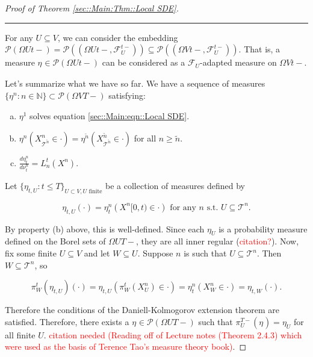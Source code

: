 \documentclass[12pt]{article}
\newcommand{\mb}{\mathbb}
\newcommand{\mc}{\mathcal}
\newcommand{\ms}{\mathscr}
\newcommand{\te}{\text}
\newcommand{\tr}{\textcolor{red}}
\newcommand{\ind}{\hspace{24pt}}
\newcommand{\lin}{\rule{\linewidth}{0.4 pt}}
\newcommand{\pmsr}{\mc{P}}							%
\renewcommand{\U}{U}							%
\newcommand{\UU}{W}								%
\newcommand{\T}{T}								%
\renewcommand{\t}{t}							%
\newcommand{\pup}[1]{^{#1}}							%
\newcommand{\tree}{\mc{T}}							%
\newcommand{\V}{V}									%
\newcommand{\numb}{n}								%
\newcommand{\piV}[2]{\pi_{#1}^{#2}}					%
\newcommand{\rxvtsn}[3]{X_{#1}^{#3}{#2}}			%
\newcommand{\mm}[3]{\nu_{#2#1}^{#3}}						%
\newcommand{\mmm}[3]{\eta_{#2#1}^{#3}}						%
\newcommand{\F}[2]{\mc{F}_{#1}^{#2}}				%
\newcommand{\alt}{\widetilde}						%
\newcommand{\dense}[2]{L_{#1}^{#2}}				%
\begin{document}
\begin{proof}[Proof of Theorem \ref{sec::Main:Thm::Local SDE}]
\lin

For any \(\U\subseteq \V\), we can consider the embedding \(\pmsr\left(\Omega{\U}{\t-}\right) = \pmsr\left((\Omega{\U}{\t-},\F{\U}{\t-})\right) \subseteq \pmsr\left((\Omega{\V}{\t-},\F{\U}{\t-})\right)\). That is, a measure \(\mmm{}{}{}\in \pmsr\left(\Omega{\U}{\t-}\right)\) can be considered as a \(\F{\U}{}\)-adapted measure on \(\Omega{\V}{\t-}\).

\ind Let's summarize what we have so far. We have a sequence of measures \(\{\mmm{}{}{\numb}:\numb\in\mb{N}\} \subset \pmsr(\Omega{\V}{\T-})\) satisfying:

\begin{enumerate}[(a)]
\item \(\mmm{}{}{1}\) solves equation \eqref{sec::Main:eqn::Local SDE}.

\item \(\mmm{}{}{\numb}(\rxvtsn{\tree\pup{\alt{\numb}}}{}{\numb} \in \cdot) = \mmm{}{}{\alt{\numb}}(\rxvtsn{\tree\pup{\alt{\numb}}}{}{\alt{\numb}}\in \cdot)\) for all \(\numb \geq \alt{\numb}\).

\item \(\frac{d\mmm{}{\t}{\numb}}{d\mm{}{\t}{\numb}} = \dense{\numb}{\t}(\rxvtsn{}{}{\numb})\).
\end{enumerate}

Let \(\{\mmm{\U}{\t,}{}:\t \leq \T\}_{\U\subset \V,\U\te{ finite}}\) be a collection of measures defined by

\[\mmm{\U}{\t,}{}(\cdot) = \mmm{}{\t}{\numb}(\rxvtsn{}{[0,\t)}{\numb} \in \cdot) \te{ for any }\numb\te{ s.t. }\U \subseteq \tree\pup{\numb}.\]

By property (b) above, this is well-defined. Since each \(\mmm{\U}{}{}\) is a probability measure defined on the Borel sets of \(\Omega{\U}{\T-}\), they are all inner regular (\tr{citation?}). Now, fix some finite \(\U\subseteq \V\) and let \(\UU \subseteq \U\). Suppose \(\numb\) is such that \(\U \subseteq \tree\pup{\numb}\). Then \(\UU\subseteq \tree\pup{\numb}\), so

\[\piV{\UU}{\t}(\mmm{\U}{\t,}{})(\cdot) = \mmm{\U}{\t,}{}\left(\piV{\UU}{\t}(\rxvtsn{\U}{}{\numb}) \in \cdot\right) = \mmm{}{\t}{\numb}\left(\rxvtsn{\UU}{}{\numb} \in \cdot\right) = \mmm{\UU}{\t,}{}(\cdot).\]

Therefore the conditions of the Daniell-Kolmogorov extension theorem are satisfied. Therefore, there exists a \(\mmm{}{}{}\in \ms{P}(\Omega{\U}{\T-})\) such that \(\piV{\U}{\T-}(\mmm{}{}{}) =\mmm{\U}{}{}\) for all finite \(\U\). \tr{citation needed (Reading off of Lecture notes (Theorem 2.4.3) which were used as the basis of Terence Tao's measure theory book)}.


\end{proof}
\end{document}
